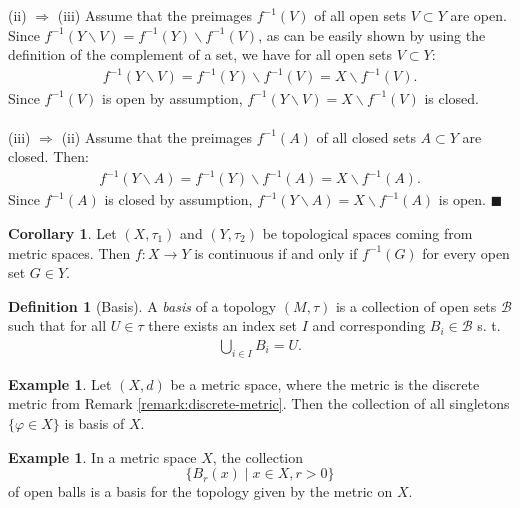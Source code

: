 \documentclass[12pt, a4paper]{article}
\numberwithin{equation}{section}
\theoremstyle{definition}
\theoremstyle{definition}
\newtheorem{defn}[thm]{Definition} %
\newtheorem{exmp}[thm]{Example} %
\newtheorem{corollary}[thm]{Corollary}
\begin{document}
	\\ 
	\\
	(ii) $\Rightarrow$ (iii) Assume that the preimages $f^{-1}(V)$ of all open sets $V\subset Y$ are open. Since $f^{-1}(Y\backslash V) = f^{-1}(Y)\backslash f^{-1}(V)$, as can be easily shown by using the definition of the complement of a set, we have for all open sets $V \subset Y$: 
	\begin{align}
		f^{-1}(Y\backslash V) = f^{-1}(Y)\backslash f^{-1}(V) = X\backslash f^{-1}(V). 
	\end{align}
	Since $f^{-1}(V)$ is open by assumption, $f^{-1}(Y\backslash V) = X\backslash f^{-1}(V)$ is closed. 
	\\ 
	\\
	(iii) $\Rightarrow$ (ii) Assume that the preimages $f^{-1}(A)$
	of all closed sets $A\subset Y$ are closed. Then: 
	\begin{align}
		f^{-1}(Y\backslash A) = f^{-1}(Y)\backslash f^{-1}(A) = X\backslash f^{-1}(A). 
	\end{align}
	Since $f^{-1}(A)$ is closed by assumption, $f^{-1}(Y\backslash A) = X\backslash f^{-1}(A)$ is open. \cite{preimage-of-closed-sets} \qquad\qquad\qquad\qquad\qquad\quad$\blacksquare$
	
	\begin{corollary}
		Let $(X, \tau_1)$ and $(Y, \tau_2)$ be topological spaces coming from metric spaces. Then $f: X\rightarrow Y$ is continuous if and only if $f^{-1}(G)$ for every open set $G\in Y$. 
	\end{corollary}
	
	\begin{defn}[Basis]
		A \textit{basis} of a topology $\left(M, \tau\right)$ is a collection of open sets $\mathcal B$ such that for all $U\in \tau$ there exists an index set $I$ and corresponding $B_i\in \mathcal B$ s. t. 
		\begin{align}
			\bigcup_{i\in I}B_i = U. 
		\end{align}
	\end{defn}

	\begin{exmp}\label{basis_discrete_metric}
		Let $(X, d)$ be a metric space, where the metric is the discrete metric from Remark \ref{remark:discrete-metric}. Then the collection of all singletons $\{\varphi\in X\}$ is basis of $X$. 
	\end{exmp}
	
	\begin{exmp}\label{basis_metric_space}
		In a metric space $X$, the collection $$\{ B_{r}(x) \mid x\in X, r > 0 \}$$ of open balls is a basis for the topology given by the metric on $X$. 
	\end{exmp}
\end{document}
